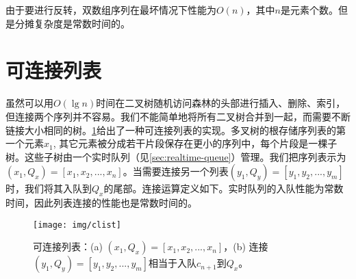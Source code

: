 \documentclass[b5paper]{ctexart}
\begin{document}
由于要进行反转，双数组序列在最坏情况下性能为$O(n)$，其中$n$是元素个数。但是分摊复杂度是常数时间的。

\begin{Exercise}\label{ex:paired-array-seq}
\end{Exercise}

\begin{Answer}[ref = {ex:paired-array-seq}]
\end{Answer}

\section{可连接列表}

虽然可以用$O(\lg n)$时间在二叉树随机访问森林的头部进行插入、删除、索引，但连接两个序列并不容易。我们不能简单地将所有二叉树合并到一起，而需要不断链接大小相同的树。\cref{fig:clist}给出了一种可连接列表的实现。多叉树的根存储序列表的第一个元素$x_1$, 其它元素被分成若干片段保存在更小的序列中，每个片段是一棵子树。这些子树由一个实时队列（见\cref{sec:realtime-queue}）管理。我们把序列表示为$(x_1, Q_x) = [x_1, x_2, ..., x_n]$。当需要连接另一个列表$(y_1, Q_y) = [y_1, y_2, ..., y_m]$时，我们将其入队到$Q_x$的尾部。连接运算定义如下。实时队列的入队性能为常数时间，因此列表连接的性能也是常数时间的。

\begin{figure}[htbp]
  \centering
  \texttt{[image: img/clist]}
  \caption{可连接列表：(a) $(x_1, Q_x) = [x_1, x_2, ..., x_n]$，(b) 连接$(y_1, Q_y) = [y_1, y_2, ..., y_m]$相当于入队$c_{n+1}$到$Q_x$。}
  \label{fig:clist}
\end{figure}
\end{document}
